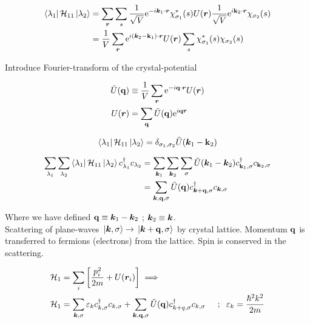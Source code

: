 \begin{align}
	\bra{\lambda_{1}} \mathcal{H}_{11} \ket{\lambda_{2}} &= \sum_{\bm{r}} \sum_s \frac{1}{\sqrt{V}} \mathrm{e}^{-i \bm{k}_1\cdot \bm{r}} \chi_{\sigma_1}^*(s) U(\bm{r}) \frac{1}{\sqrt{V}} \mathrm{e}^{i \vb{k}_2 \cdot \bm{r}} \chi_{\sigma_2}(s)\\
	&= \frac{1}{V} \sum_{\bm{r}} \mathrm{e}^{i (\bm{k}_2-\vb{k}_1) \cdot \bm{r}} U(\bm{r}) \sum_s \chi_{\sigma_1}^* (s) \chi_{\sigma_2}(s) \nonumber 
\end{align}

\noindent Introduce Fourier-transform of the crystal-potential

\begin{align}
	\tilde{U}(\vb{q}) &\equiv \frac{1}{V} \sum_{\bm{r}} \mathrm{e}^{-i \vb{q}\cdot \bm{r}} U(\bm{r})\\
	U(\bm{r}) &= \sum_{\vb{q}} \tilde{U}(\vb{q}) \mathrm{e}^{i \vb{q} \bm{r}}
\end{align}

\begin{equation}
	\bra{\lambda_{1}} \mathcal{H}_{11} \ket{\lambda_{2}}= \delta_{\sigma_1,\sigma_2} \tilde{U}(\bm{k}_1-\vb{k}_2)
\end{equation}


\begin{align}
	\sum_{\lambda_{1}} \sum_{\lambda_{2}} 	\bra{\lambda_{1}} \mathcal{H}_{11} \ket{\lambda_{2}} c^{\dagger}_{\lambda_1} c_{\lambda_{2}} &= \sum_{\bm{k}_1} \sum_{\bm{k}_2} \sum_{\sigma} \tilde{U}(\bm{k}_1-\bm{k}_2) c^{\dagger}_{ \vb{k}_1, \sigma} c_{\vb{k}_2, \sigma} \nonumber \\
	&= \sum_{\bm{k}, \vb{q}, \sigma} \tilde{U} (\vb{q}) c^{\dagger}_{ \bm{k}+\vb{q}, \sigma} c_{\bm{k}, \sigma} \nonumber
\end{align}

\noindent Where we have defined $\vb{q} \equiv \bm{k}_1- \bm{k}_2$ ; $\bm{k}_2 \equiv \bm{k}$.\\
\linebreak
\noindent Scattering of plane-waves $\ket*{\bm{k}, \sigma} \rightarrow \ket*{\bm{k}+\vb{q}, \sigma}$ by crystal lattice. Momentum $\vb{q}$ is transferred to fermions (electrons) from the lattice. Spin is conserved in the scattering. 

\begin{align}
	\mathcal{H}_1 &= \sum_i \left[ \frac{p_i^2}{2m}+U(\bm{r}_i) \right] \implies \\
	\mathcal{H}_1 &= \sum_{\bm{k}, \sigma} \varepsilon_k c^{\dagger}_{k, \sigma} c_{k, \sigma} +\sum_{\bm{k},\vb{q}, \sigma} \tilde{U}(\vb{q})  c^{\dagger}_{ k+q, \sigma} c_{k,\sigma} \hspace{0.5cm} ; \hspace{0.2cm} \varepsilon_k= \frac{\hbar^2 k^2}{2m}
\end{align}


